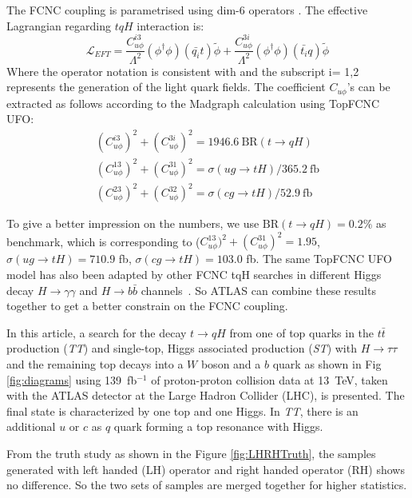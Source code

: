 The FCNC coupling is parametrised using dim-6 operators \cite{fcnc_production_theory}. The effective Lagrangian regarding $tqH$ interaction is:
%
\begin{equation}
\mathcal{L}_{EFT} = \frac{C^{i3}_{u\phi}}{\Lambda^{2}}(\phi^{\dagger}\phi)(\bar{q_{i}}t)\tilde{\phi} + \frac{C^{3i}_{u\phi}}{\Lambda^{2}}(\phi^{\dagger}\phi)(\bar{t_{i}}q)\tilde{\phi}
\label{eq:eq01}
\end{equation}
%
Where the operator notation is consistent with \cite{fcnc_production_theory} and the subscript i= 1,2 represents the generation of the light quark fields. 
The coefficient $C_{u\phi}$'s can be extracted as follows according to the Madgraph calculation using TopFCNC UFO:
\begin{equation}
\begin{array}{l}
(C^{i3}_{u\phi})^2 + (C^{3i}_{u\phi})^2 = 1946.6~\text{BR}(t\to qH)\\
(C^{13}_{u\phi})^2 + (C^{31}_{u\phi})^2 = \sigma(ug\to tH)/365.2~\text{fb}\\
(C^{23}_{u\phi})^2 + (C^{32}_{u\phi})^2 = \sigma(cg\to tH)/52.9~\text{fb}
\end{array}
\label{eq:eq02}
\end{equation}

To give a better impression on the numbers, we use $\text{BR}(t\to qH)=0.2\%$ as benchmark, which is corresponding to ($C^{13}_{u\phi})^2 + (C^{31}_{u\phi})^2=1.95$, $\sigma(ug\to tH)=710.9$ fb, $\sigma(cg\to tH)=103.0$ fb. The same TopFCNC UFO model has also been adapted by other FCNC tqH searches in different Higgs decay $H\rightarrow\gamma\gamma$ and $H\rightarrow b\bar b$
channels~\cite{tqHgammagamma,tqHbb}. So ATLAS can combine these results together to get a better constrain on the FCNC coupling.  

In this article, a search for the decay $t\to qH$ from one of top quarks in the $t\bar{t}$ production (\textit{TT}) and single-top, Higgs associated production (\textit{ST}) with $H\to\tau\tau$ and the remaining top decays into a $W$ boson and a $b$ quark as shown in Fig \ref{fig:diagrams} using 139~fb$^{-1}$ of proton-proton collision data at 13~TeV, taken with the ATLAS detector at the Large Hadron Collider (LHC), is presented. The final state is characterized by one top and one Higgs. In \textit{TT}, there is an additional $u$ or $c$ as $q$ quark forming a top resonance with Higgs.



From the truth study as shown in the Figure \ref{fig:LHRHTruth}, the samples generated with left handed (LH) operator and right handed operator (RH) shows no difference. So the two sets of samples are merged together for higher statistics.

